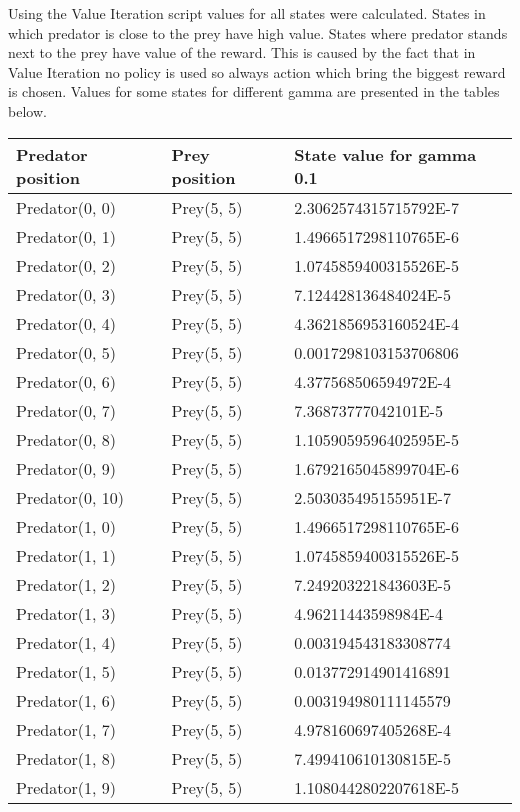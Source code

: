 

Using the Value Iteration script values for all states were calculated. States in which predator is close to the prey have high value. States where predator stands next to the prey have value of the reward. This is caused by the fact that in Value Iteration no policy is used so always action which bring the biggest reward is chosen. Values for some states for different gamma are presented in the tables below.


\begin{longtable}{| p{} | p{} | p{} |} 
   Predator position & Prey position & State value for gamma 0.1 \\
    \hline
 Predator(0, 0) & Prey(5, 5) &2.3062574315715792E-7\\
Predator(0, 1) & Prey(5, 5) &1.4966517298110765E-6\\
Predator(0, 2) & Prey(5, 5) &1.0745859400315526E-5\\
Predator(0, 3) & Prey(5, 5) &7.124428136484024E-5\\
Predator(0, 4) & Prey(5, 5) &4.3621856953160524E-4\\
Predator(0, 5) & Prey(5, 5) &0.0017298103153706806\\
Predator(0, 6) & Prey(5, 5) &4.377568506594972E-4\\
Predator(0, 7) & Prey(5, 5) &7.36873777042101E-5\\
Predator(0, 8) & Prey(5, 5) &1.1059059596402595E-5\\
Predator(0, 9) & Prey(5, 5) &1.6792165045899704E-6\\
Predator(0, 10) & Prey(5, 5) &2.503035495155951E-7\\
Predator(1, 0) & Prey(5, 5) &1.4966517298110765E-6\\
Predator(1, 1) & Prey(5, 5) &1.0745859400315526E-5\\
Predator(1, 2) & Prey(5, 5) &7.249203221843603E-5\\
Predator(1, 3) & Prey(5, 5) &4.96211443598984E-4\\
Predator(1, 4) & Prey(5, 5) &0.003194543183308774\\
Predator(1, 5) & Prey(5, 5) &0.013772914901416891\\
Predator(1, 6) & Prey(5, 5) &0.003194980111145579\\
Predator(1, 7) & Prey(5, 5) &4.978160697405268E-4\\
Predator(1, 8) & Prey(5, 5) &7.499410610130815E-5\\
Predator(1, 9) & Prey(5, 5) &1.1080442802207618E-5\\

\end{longtable}
